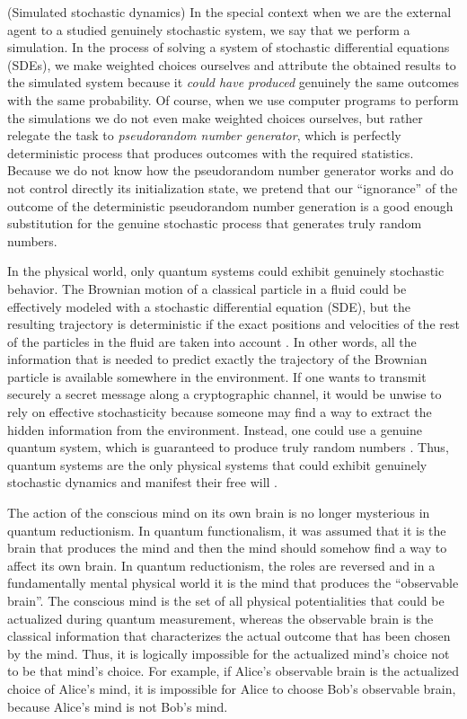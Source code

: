\documentclass{ws-ijmpb}
\begin{document}
\begin{example}
(Simulated stochastic dynamics) In the special context when we are
the external agent to a studied genuinely stochastic system, we say
that we perform a simulation. In the process of solving a system of
stochastic differential equations (SDEs), we make weighted choices
ourselves and attribute the obtained results to the simulated system
because it \emph{could have produced} genuinely the same outcomes
with the same probability. Of course, when we use computer programs
to perform the simulations we do not even make weighted choices ourselves,
but rather relegate the task to \emph{pseudorandom number generator},
which is perfectly deterministic process that produces outcomes with
the required statistics. Because we do not know how the pseudorandom
number generator works and do not control directly its initialization
state, we pretend that our ``ignorance'' of the outcome of
the deterministic pseudorandom number generation is a good enough
substitution for the genuine stochastic process that generates truly
random numbers.
\end{example}

In the physical world, only quantum systems could exhibit genuinely
stochastic behavior. The Brownian motion of a classical particle in
a fluid could be effectively modeled with a stochastic differential
equation (SDE), but the resulting trajectory is deterministic if the
exact positions and velocities of the rest of the particles in the
fluid are taken into account \cite{Langevin1908}. In other words,
all the information that is needed to predict exactly the trajectory
of the Brownian particle is available somewhere in the environment.
If one wants to transmit securely a secret message along a cryptographic
channel, it would be unwise to rely on effective stochasticity because
someone may find a way to extract the hidden information from the
environment. Instead, one could use a genuine quantum system, which
is guaranteed to produce truly random numbers \cite{Gabriel2010,Zhang2021}.
Thus, quantum systems are the only physical systems that could exhibit
genuinely stochastic dynamics and manifest their free will \cite{Georgiev2021}.

The action of the conscious mind on its own brain is no longer mysterious
in quantum reductionism. In quantum functionalism, it was assumed
that it is the brain that produces the mind and then the mind should
somehow find a way to affect its own brain. In quantum reductionism,
the roles are reversed and in a fundamentally mental physical world
it is the mind that produces the ``observable brain''. The
conscious mind is the set of all physical potentialities that could
be actualized during quantum measurement, whereas the observable brain
is the classical information that characterizes the actual outcome
that has been chosen by the mind. Thus, it is logically impossible
for the actualized mind's choice not to be that mind's choice. For
example, if Alice's observable brain is the actualized choice of Alice's
mind, it is impossible for Alice to choose Bob's observable brain,
because Alice's mind is not Bob's mind.
\end{document}

